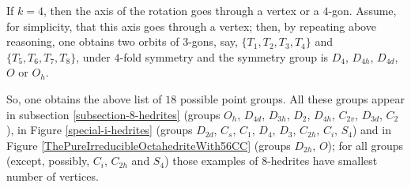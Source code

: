 \documentclass[12pt]{article}
\begin{document}
If $k=4$, then the axis of the rotation goes through a vertex or
a $4$-gon. Assume, for simplicity, that this axis goes through a
vertex; then, by repeating above reasoning, one obtains two orbits of
$3$-gons, say, $\{T_1, T_2, T_3, T_4\}$ and $\{T_5, T_6, T_7, T_8\}$,
under $4$-fold symmetry and the symmetry group is $D_4$, $D_{4h}$,
$D_{4d}$, $O$ or $O_h$.

So, one obtains the above list of $18$ possible point groups. All 
these groups appear in subsection \ref{subsection-8-hedrites} (groups 
$O_h$, $D_{4d}$, $D_{3h}$, $D_{2}$, $D_{4h}$, $C_{2v}$, $D_{3d}$, $C_2$),
in Figure \ref{special-i-hedrites} (groups $D_{2d}$, $C_s$, $C_1$, $D_4$, 
$D_{3}$, $C_{2h}$, $C_{i}$, $S_4$) and in Figure 
\ref{ThePureIrreducibleOctahedriteWith56CC} (groups $D_{2h}$, $O$); for
all groups (except, possibly, $C_i$, $C_{2h}$ and $S_4$) those examples
of $8$-hedrites have smallest number of vertices.
\end{document}

